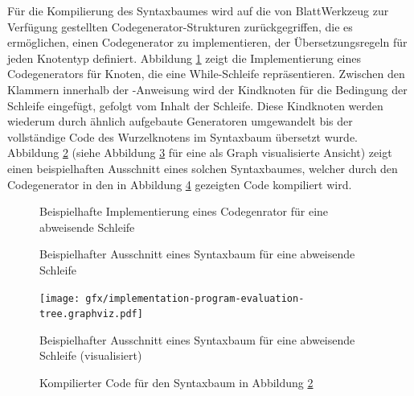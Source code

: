 Für die Kompilierung des Syntaxbaumes wird auf die von BlattWerkzeug zur Verfügung gestellten Codegenerator-Strukturen zurückgegriffen, die es ermöglichen, einen Codegenerator zu implementieren, der Übersetzungsregeln für jeden Knotentyp definiert. Abbildung \ref{fig:implementation:program:evaluation:while} zeigt die Implementierung eines Codegenerators für Knoten, die eine While-Schleife repräsentieren. Zwischen den Klammern innerhalb der -Anweisung wird der Kindknoten für die Bedingung der Schleife eingefügt, gefolgt vom Inhalt der Schleife. Diese Kindknoten werden wiederum durch ähnlich aufgebaute Generatoren umgewandelt bis der vollständige Code des Wurzelknotens im Syntaxbaum übersetzt wurde. Abbildung \ref{fig:implementation:program:evaluation:tree} (siehe Abbildung \ref{fig:implementation:program:evaluation:tree-render} für eine als Graph visualisierte Ansicht) zeigt einen beispielhaften Ausschnitt eines solchen Syntaxbaumes, welcher durch den Codegenerator in den in Abbildung \ref{fig:implementation:program:evaluation:tree-result} gezeigten Code kompiliert wird.

\begin{figure}
  
  \caption{Beispielhafte Implementierung eines Codegenrator für eine abweisende Schleife}
  \label{fig:implementation:program:evaluation:while}
\end{figure}

\begin{figure}
  
  \caption{Beispielhafter Ausschnitt eines Syntaxbaum für eine abweisende Schleife}
  \label{fig:implementation:program:evaluation:tree}
\end{figure}

\begin{figure}
  \centering
  \texttt{[image: gfx/implementation-program-evaluation-tree.graphviz.pdf]}
  \caption{Beispielhafter Ausschnitt eines Syntaxbaum für eine abweisende Schleife (visualisiert)}
  \label{fig:implementation:program:evaluation:tree-render}
\end{figure}

\begin{figure}
  
  \caption{Kompilierter Code für den Syntaxbaum in Abbildung \ref{fig:implementation:program:evaluation:tree}}
  \label{fig:implementation:program:evaluation:tree-result}
\end{figure}

